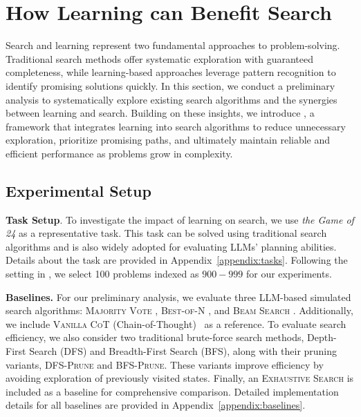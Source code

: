 \section{How Learning can Benefit Search}

Search and learning represent two fundamental approaches to problem-solving. Traditional search methods offer systematic exploration with guaranteed completeness, while learning-based approaches leverage pattern recognition to identify promising solutions quickly. 
In this section, we conduct a preliminary analysis to systematically explore {existing search algorithms and} the synergies between learning and search. Building on these insights, we introduce \method, a framework that integrates learning into search algorithms to reduce unnecessary exploration, prioritize promising paths, and ultimately maintain reliable and efficient performance as problems grow in complexity.

\subsection{Experimental Setup}
\label{sec:preliminary_setup}
\textbf{Task Setup}. To investigate the impact of learning on search, we use \textit{the Game of 24} as a representative task. This task can be solved using traditional search algorithms and is also widely adopted for evaluating LLMs' planning abilities. Details about the task are provided in Appendix~\ref{appendix:tasks}. Following the setting in \citet{yao2023tree}, we select \num{100} problems indexed as $900-999$ for our experiments.


\noindent \textbf{Baselines.} For our preliminary analysis, we evaluate three LLM-based simulated search algorithms: \textsc{Majority Vote} \cite{wang2023selfconsistency}, \textsc{Best-of-N} \cite{snell2024scaling}, and \textsc{Beam Search} \cite{yao2023tree}. Additionally, we include \textsc{Vanilla CoT} (Chain-of-Thought)~\cite{wei2022chain} as a reference. To evaluate search efficiency, we also consider two traditional brute-force search methods, Depth-First Search (\textsc{DFS}) and Breadth-First Search (\textsc{BFS}), along with their pruning variants, \textsc{DFS-Prune} and \textsc{BFS-Prune}. These variants improve efficiency by avoiding exploration of previously visited states. Finally, an \textsc{Exhaustive Search} is included as a baseline for comprehensive comparison.
Detailed implementation details for all baselines are provided in Appendix~\ref{appendix:baselines}.

